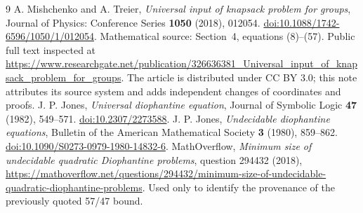 \documentclass[11pt]{article}
\begin{document}
\begin{thebibliography}{9}
 A. Mishchenko and A. Treier,
\emph{Universal input of knapsack problem for groups},
Journal of Physics: Conference Series \textbf{1050} (2018), 012054.
\href{https://doi.org/10.1088/1742-6596/1050/1/012054}{doi:10.1088/1742-6596/1050/1/012054}.
Mathematical source: Section~4, equations (8)--(57).
Public full text inspected at
\url{https://www.researchgate.net/publication/326636381_Universal_input_of_knapsack_problem_for_groups}.
The article is distributed under CC BY 3.0; this note attributes its source
system and adds independent changes of coordinates and proofs.
 J. P. Jones, \emph{Universal diophantine equation},
Journal of Symbolic Logic \textbf{47} (1982), 549--571.
\href{https://doi.org/10.2307/2273588}{doi:10.2307/2273588}.
 J. P. Jones, \emph{Undecidable diophantine equations},
Bulletin of the American Mathematical Society \textbf{3} (1980), 859--862.
\href{https://doi.org/10.1090/S0273-0979-1980-14832-6}{doi:10.1090/S0273-0979-1980-14832-6}.
 MathOverflow, \emph{Minimum size of undecidable quadratic
Diophantine problems}, question 294432 (2018),
\url{https://mathoverflow.net/questions/294432/minimum-size-of-undecidable-quadratic-diophantine-problems}.
Used only to identify the provenance of the previously quoted 57/47 bound.
\end{thebibliography}
\end{document}
